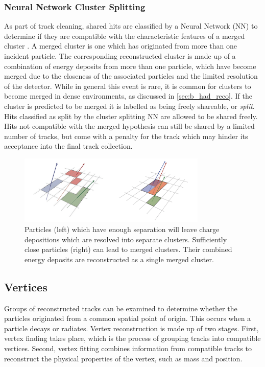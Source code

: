 \subsubsection{Neural Network Cluster Splitting}
As part of track cleaning, shared hits are classified by a Neural Network (NN) to determine if they are compatible with the characteristic features of a merged cluster \cite{2014arXiv1406.7690A, ATL-PHYS-PUB-2015-006}.
A merged cluster is one which has originated from more than one incident particle.
The corresponding reconstructed cluster is made up of a combination of energy deposits from more than one particle, which have become merged due to the closeness of the associated particles and the limited resolution of the detector.
While in general this event is rare, it is common for clusters to become merged in dense environments, as discussed in \cref{sec:b_had_reco}.
If the cluster is predicted to be merged it is labelled as being freely shareable, or \textit{split}.
Hits classified as split by the cluster splitting NN are allowed to be shared freely.
Hits not compatible with the merged hypothesis can still be shared by a limited number of tracks, but come with a penalty for the track which may hinder its acceptance into the final track collection.
%
\begin{figure}[ht]
    \centering
    \includegraphics[width=0.8\textwidth]{chapters/2.detector/figs/merged-cluster.png}
    \caption{
      Particles (left) which have enough separation will leave charge depositions which are resolved into separate clusters.
      Sufficiently close particles (right) can lead to merged clusters.
      Their combined energy deposits are reconstructed as a single merged cluster.}
    \label{fig:resolved/merged clusters}
\end{figure}
%


\subsection{Vertices}\label{sec:vertex_reco}
Groups of reconstructed tracks can be examined to determine whether the particles originated from a common spatial point of origin.
This occurs when a particle decays or radiates.
Vertex reconstruction is made up of two stages.
First, vertex finding takes place, which is the process of grouping tracks into compatible vertices.
Second, vertex fitting combines information from compatible tracks to reconstruct the physical properties of the vertex, such as mass and position.



